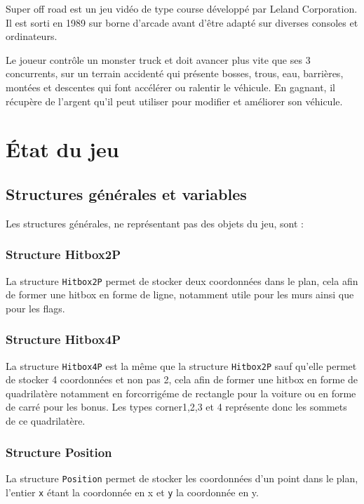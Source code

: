 \documentclass[11pt]{report}
\renewcommand{\tt}[1]{\texttt{#1}}
\begin{document}
Super off road est un jeu vidéo de type course développé par Leland Corporation. Il est sorti en 1989 sur borne d'arcade avant d'être adapté sur diverses consoles et ordinateurs. 

Le joueur contrôle un monster truck et doit avancer plus vite que ses 3 concurrents, sur un terrain accidenté qui présente bosses, trous, eau, barrières, montées et descentes qui font accélérer ou ralentir le véhicule. En gagnant, il récupère de l'argent qu'il peut utiliser pour modifier et améliorer son véhicule. 

\section{État du jeu}
\subsection{Structures générales et variables}

Les structures générales, ne représentant pas des objets du jeu, sont : 

\subsubsection{Structure Hitbox2P}


La structure \tt{Hitbox2P} permet de stocker deux coordonnées dans le plan, cela afin de former une hitbox en forme de ligne, notamment utile pour les murs ainsi que pour les flags. 

\subsubsection{Structure Hitbox4P}


La structure \tt{Hitbox4P} est la même que la structure \tt{Hitbox2P} sauf qu'elle permet de stocker 4 coordonnées et non pas 2, cela afin de former une hitbox en forme de quadrilatère notamment en forcorrigéme de rectangle pour la voiture ou en forme de carré pour les bonus. Les types corner1,2,3 et 4 représente donc les sommets de ce quadrilatère.


\subsubsection{Structure Position}


La structure \tt{Position} permet de stocker les coordonnées d'un point dans le plan, l'entier \tt{x} étant la coordonnée en x et \tt{y} la coordonnée en y.
\end{document}

